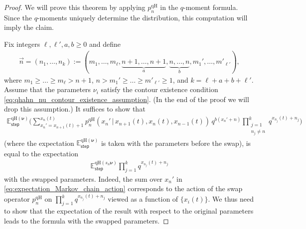 \documentclass[11pt]{article}
\numberwithin{equation}{section}
\numberwithin{equation}{section}
\begin{document}
\begin{proof}
	We will prove this theorem by applying
	$p_n^{\mathrm{qH}}$
	in the $q$-moment formula.
	Since the $q$-mo\-ments uniquely determine
	the distribution, this computation will imply the claim.
	
	Fix integers $\ell,\ell',a,b\ge0$ and define
	\begin{gather}
	\label{eq:n_a_b_notation}
	\vec n=(n_1,\ldots,n_k ):=(m_1,\ldots,m_\ell,\underbrace{n+1,\ldots,n+1 }_a,
 \underbrace{n,\ldots,n }_b,m_1',\ldots,m'_{\ell'}),
	\end{gather}
	where $m_1\ge \dots\ge m_\ell>n+1$,
	$n>m_1'\ge \dots\ge m'_{\ell'}\ge1$, and
	$k=\ell+a+b+\ell'$.
	Assume that the parameters $\nu_i$ satisfy
	the contour existence condition
	\eqref{eq:qhahn_nu_contour_existence_assumption}. (In the end
	of the proof we will drop this assumption.)
	It suffices to show that
	\begin{gather}
		\label{eq:expectation_Markov_chain_action}
		\mathbb{E}^{\mathrm{qH}(\boldsymbol\nu)}_{\mathsf{step}}
		\bigg(
			\sum_{x_n'=x_{n+1}(t)+1}^{x_n(t)}
			p_n^{\mathrm{qH}}
			(x_n'\,|\, x_{n+1}(t),x_n(t),x_{n-1}(t))
			\,q^{b(x_n'+n)}
			\prod_{\substack{j=1 \\n_j\ne n}}^{k}q^{x_{n_j}(t)+n_j}
		\biggr)
	\end{gather}
	(where the expectation
	$\mathbb{E}^{\mathrm{qH}(\boldsymbol\nu)}_{\mathsf{step}}$
	is taken with the
	parameters before the swap),
	is equal to the expectation
	\begin{gather}
		\label{eq:expectation_desired_for_qhahn}
		\mathbb{E}^{\mathrm{qH}(s_n\boldsymbol\nu)}_{\mathsf{step}}
		\prod_{j=1}^{k}q^{x_{n_j}(t)+n_j}
	\end{gather}
	with the swapped parameters.
	Indeed,
	the sum over $x_n'$
	in
	\eqref{eq:expectation_Markov_chain_action}
	corresponds to the action of the swap operator
	$p_n^{\mathrm{qH}}$
	on
	$\prod_{j=1}^{k}q^{x_{n_j}(t)+n_j}$ viewed as a function of $\{x_i(t)\}$.
	We thus need to show that the expectation of the result
	with respect to the original parameters
	leads to
	the formula with the swapped parameters.
	
	
	

\end{proof}
\end{document}
